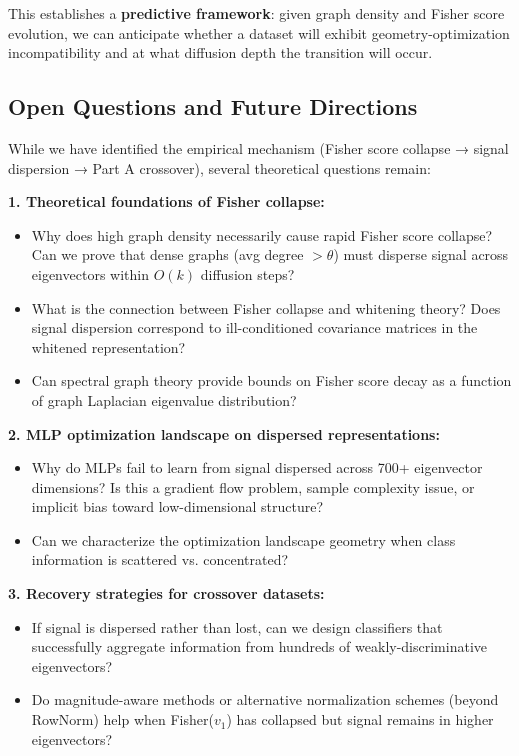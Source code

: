 \documentclass[11pt]{article}
\begin{document}
This establishes a \textbf{predictive framework}: given graph density and Fisher score evolution, we can anticipate whether a dataset will exhibit geometry-optimization incompatibility and at what diffusion depth the transition will occur.

\subsection{Open Questions and Future Directions}

While we have identified the empirical mechanism (Fisher score collapse → signal dispersion → Part A crossover), several theoretical questions remain:

\textbf{1. Theoretical foundations of Fisher collapse:}
\begin{itemize}
\item Why does high graph density necessarily cause rapid Fisher score collapse? Can we prove that dense graphs (avg degree $> \theta$) must disperse signal across eigenvectors within $O(k)$ diffusion steps?
\item What is the connection between Fisher collapse and whitening theory? Does signal dispersion correspond to ill-conditioned covariance matrices in the whitened representation?
\item Can spectral graph theory provide bounds on Fisher score decay as a function of graph Laplacian eigenvalue distribution?
\end{itemize}

\textbf{2. MLP optimization landscape on dispersed representations:}
\begin{itemize}
\item Why do MLPs fail to learn from signal dispersed across 700+ eigenvector dimensions? Is this a gradient flow problem, sample complexity issue, or implicit bias toward low-dimensional structure?
\item Can we characterize the optimization landscape geometry when class information is scattered vs. concentrated?
\end{itemize}

\textbf{3. Recovery strategies for crossover datasets:}
\begin{itemize}
\item If signal is dispersed rather than lost, can we design classifiers that successfully aggregate information from hundreds of weakly-discriminative eigenvectors?
\item Do magnitude-aware methods or alternative normalization schemes (beyond RowNorm) help when Fisher($v_1$) has collapsed but signal remains in higher eigenvectors?
\end{itemize}
\end{document}
